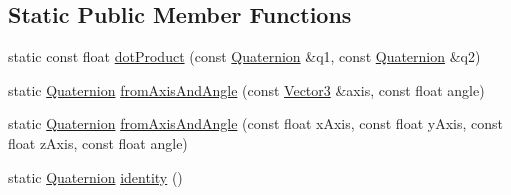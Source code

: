 \subsection*{Static Public Member Functions}
\begin{DoxyCompactItemize}
\item 
static const float \hyperlink{classprism_1_1geometry_1_1_quaternion_a128b73113354b13a07ffa745947c7813}{dot\+Product} (const \hyperlink{classprism_1_1geometry_1_1_quaternion}{Quaternion} \&q1, const \hyperlink{classprism_1_1geometry_1_1_quaternion}{Quaternion} \&q2)
\item 
static \hyperlink{classprism_1_1geometry_1_1_quaternion}{Quaternion} \hyperlink{classprism_1_1geometry_1_1_quaternion_a1e2bdf5339aa69325bd572505941fae7}{from\+Axis\+And\+Angle} (const \hyperlink{classprism_1_1geometry_1_1_vector3}{Vector3} \&axis, const float angle)
\item 
static \hyperlink{classprism_1_1geometry_1_1_quaternion}{Quaternion} \hyperlink{classprism_1_1geometry_1_1_quaternion_aec2514a7f861f2ed329606a197db1678}{from\+Axis\+And\+Angle} (const float x\+Axis, const float y\+Axis, const float z\+Axis, const float angle)
\item 
static \hyperlink{classprism_1_1geometry_1_1_quaternion}{Quaternion} \hyperlink{classprism_1_1geometry_1_1_quaternion_ac8648074982947ef4815340ab2ca357e}{identity} ()
\end{DoxyCompactItemize}
